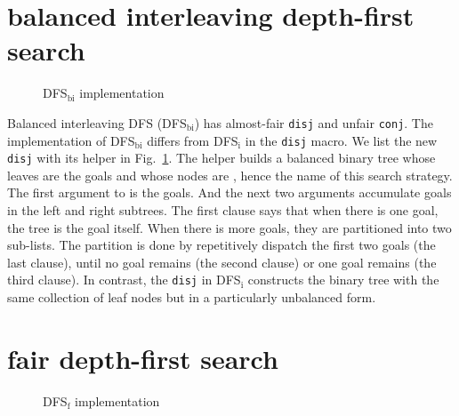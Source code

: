 \documentclass[format=acmlarge, review=true, authordraft=true]{acmart}
\newcommand{\conj}{\texttt{conj}}
\newcommand{\disj}{\texttt{disj}}
\begin{document}
\section{balanced interleaving depth-first search}

\begin{figure}
	
	\caption{DFS$_\textrm{bi}$ implementation}
	\label{balanced-disj}
\end{figure}

Balanced interleaving DFS (DFS$_\textrm{bi}$) has almost-fair \disj{} and unfair 
\conj{}. The implementation of DFS$_\textrm{bi}$ differs from DFS$_\textrm{i}$ 
in the \disj{} macro. We list the new \disj{} with its helper in 
Fig.~\ref{balanced-disj}. The helper  builds a balanced binary tree 
whose leaves are the goals and whose nodes are , hence the name of 
this search strategy. The first argument 
to  is the goals. And the next two arguments accumulate goals in 
the left and right subtrees. The first clause says that when there is one goal, 
the tree is the goal itself. When there is more goals, they are partitioned 
into two sub-lists. The partition is done by repetitively dispatch the first 
two goals (the last clause), until no goal remains (the second clause) or one 
goal remains (the third clause). In contrast, the \disj{} in DFS$_\textrm{i}$ 
constructs the binary tree with the same collection of leaf nodes but in a 
particularly unbalanced form.



\section{fair depth-first search}

\begin{figure}
	
	\caption{DFS$_\textrm{f}$ implementation}
	\label{fDFS}
\end{figure}
\end{document}
